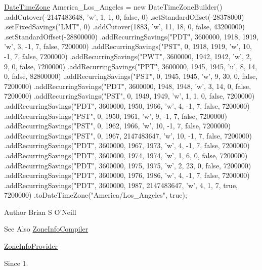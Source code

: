\begin{DoxyPre}
\hyperlink{classorg_1_1joda_1_1time_1_1_date_time_zone}{DateTimeZone} America\_Los\_Angeles = new DateTimeZoneBuilder()
    .addCutover(-2147483648, 'w', 1, 1, 0, false, 0)
    .setStandardOffset(-28378000)
    .setFixedSavings("LMT", 0)
    .addCutover(1883, 'w', 11, 18, 0, false, 43200000)
    .setStandardOffset(-28800000)
    .addRecurringSavings("PDT", 3600000, 1918, 1919, 'w',  3, -1, 7, false, 7200000)
    .addRecurringSavings("PST",       0, 1918, 1919, 'w', 10, -1, 7, false, 7200000)
    .addRecurringSavings("PWT", 3600000, 1942, 1942, 'w',  2,  9, 0, false, 7200000)
    .addRecurringSavings("PPT", 3600000, 1945, 1945, 'u',  8, 14, 0, false, 82800000)
    .addRecurringSavings("PST",       0, 1945, 1945, 'w',  9, 30, 0, false, 7200000)
    .addRecurringSavings("PDT", 3600000, 1948, 1948, 'w',  3, 14, 0, false, 7200000)
    .addRecurringSavings("PST",       0, 1949, 1949, 'w',  1,  1, 0, false, 7200000)
    .addRecurringSavings("PDT", 3600000, 1950, 1966, 'w',  4, -1, 7, false, 7200000)
    .addRecurringSavings("PST",       0, 1950, 1961, 'w',  9, -1, 7, false, 7200000)
    .addRecurringSavings("PST",       0, 1962, 1966, 'w', 10, -1, 7, false, 7200000)
    .addRecurringSavings("PST",       0, 1967, 2147483647, 'w', 10, -1, 7, false, 7200000)
    .addRecurringSavings("PDT", 3600000, 1967, 1973, 'w', 4, -1,  7, false, 7200000)
    .addRecurringSavings("PDT", 3600000, 1974, 1974, 'w', 1,  6,  0, false, 7200000)
    .addRecurringSavings("PDT", 3600000, 1975, 1975, 'w', 2, 23,  0, false, 7200000)
    .addRecurringSavings("PDT", 3600000, 1976, 1986, 'w', 4, -1,  7, false, 7200000)
    .addRecurringSavings("PDT", 3600000, 1987, 2147483647, 'w', 4, 1, 7, true, 7200000)
    .toDateTimeZone("America/Los\_Angeles", true);
\end{DoxyPre}


\begin{DoxyAuthor}{Author}
Brian S O'Neill 
\end{DoxyAuthor}
\begin{DoxySeeAlso}{See Also}
\hyperlink{classorg_1_1joda_1_1time_1_1tz_1_1_zone_info_compiler}{Zone\-Info\-Compiler} 

\hyperlink{classorg_1_1joda_1_1time_1_1tz_1_1_zone_info_provider}{Zone\-Info\-Provider} 
\end{DoxySeeAlso}
\begin{DoxySince}{Since}
1. 
\end{DoxySince}


